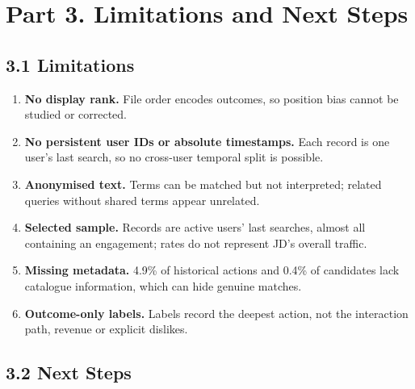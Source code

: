 \documentclass[11pt,a4paper]{article}
\begin{document}
\section{Part 3. Limitations and Next Steps}

\subsection{3.1 Limitations}

\begin{enumerate}
\item \textbf{No display rank.} File order encodes outcomes, so position bias cannot be studied or corrected.
\item \textbf{No persistent user IDs or absolute timestamps.} Each record is one user's last search, so no cross-user temporal split is possible.
\item \textbf{Anonymised text.} Terms can be matched but not interpreted; related queries without shared terms appear unrelated.
\item \textbf{Selected sample.} Records are active users' last searches, almost all containing an engagement; rates do not represent JD's overall traffic.
\item \textbf{Missing metadata.} 4.9\% of historical actions and 0.4\% of candidates lack catalogue information, which can hide genuine matches.
\item \textbf{Outcome-only labels.} Labels record the deepest action, not the interaction path, revenue or explicit dislikes.
\end{enumerate}

\subsection{3.2 Next Steps}
\end{document}
